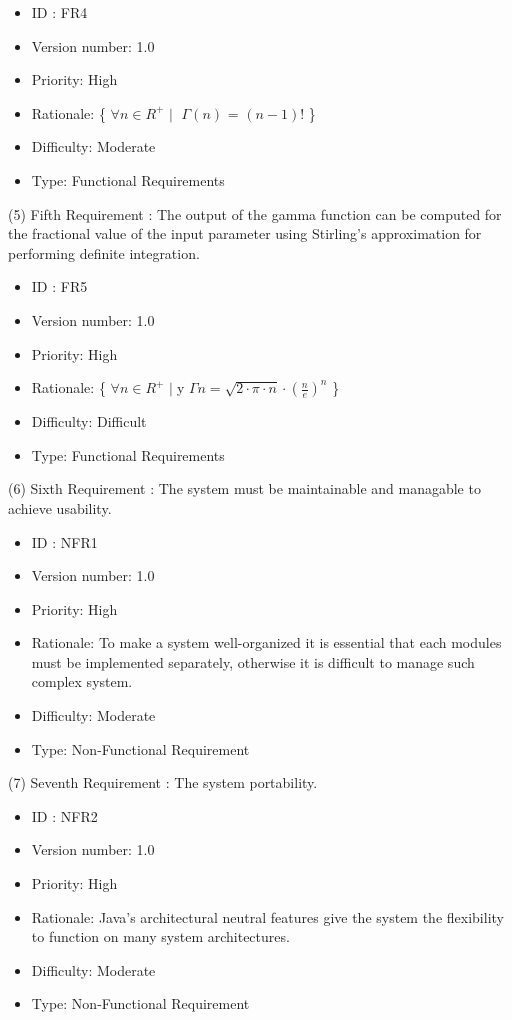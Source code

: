\documentclass[12pt,a4paper]{report}
\begin{document}
\begin{itemize}
    \item ID : FR4
    \item Version number: 1.0
    \item Priority: High
    \item Rationale: \{ $\forall n \in R^+$ $\mid\;$  $\Gamma(n)$ = $(n-1)! $ \}
    \item Difficulty: Moderate
    \item Type: Functional Requirements
\end{itemize}

(5) Fifth Requirement : The output of the gamma function can be computed for the fractional value of the input parameter using Stirling's approximation for performing definite integration.

\begin{itemize}
    \item ID : FR5
    \item Version number: 1.0
    \item Priority: High
    \item Rationale: \{ $\forall n \in R^{+}$ $\mid\;$y $\Gamma n = \sqrt{2 \cdot \pi \cdot n}\cdot (\frac{n}{e})^{n}$ \}
    \item Difficulty: Difficult
    \item Type: Functional Requirements
\end{itemize}

(6) Sixth Requirement : The system must be maintainable and managable to achieve usability.

\begin{itemize}
    \item ID : NFR1
    \item Version number: 1.0
    \item Priority: High
    \item Rationale: To make a system well-organized it is essential that each modules must be implemented separately, otherwise it is difficult to manage such complex system.
    \item Difficulty: Moderate
    \item Type: Non-Functional Requirement
\end{itemize}

(7) Seventh Requirement : The system portability.

\begin{itemize}
    \item ID : NFR2
    \item Version number: 1.0
    \item Priority: High
    \item Rationale: Java's architectural neutral features give the system the flexibility to function on many system architectures.
    \item Difficulty: Moderate
    \item Type: Non-Functional Requirement
\end{itemize}
\end{document}
